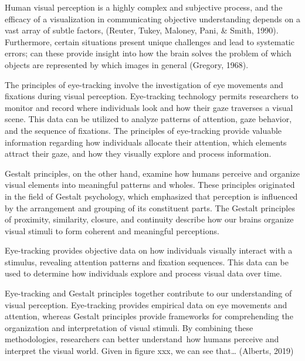 \documentclass[print]{nuthesis}
\begin{document}
Human visual perception is a highly complex and subjective process, and the efficacy of a visualization in communicating objective understanding depends on a vast array of subtle factors, (Reuter, Tukey, Maloney, Pani, \& Smith, 1990).
Furthermore, certain situations present unique challenges and lead to systematic errors; can these provide insight into how the brain solves the problem of which objects are represented by which images in general (Gregory, 1968).

The principles of eye-tracking involve the investigation of eye movements and fixations during visual perception.
Eye-tracking technology permits researchers to monitor and record where individuals look and how their gaze traverses a visual scene.
This data can be utilized to analyze patterns of attention, gaze behavior, and the sequence of fixations.
The principles of eye-tracking provide valuable information regarding how individuals allocate their attention, which elements attract their gaze, and how they visually explore and process information.

Gestalt principles, on the other hand, examine how humans perceive and organize visual elements into meaningful patterns and wholes.
These principles originated in the field of Gestalt psychology, which emphasized that perception is influenced by the arrangement and grouping of its constituent parts.
The Gestalt principles of proximity, similarity, closure, and continuity describe how our brains organize visual stimuli to form coherent and meaningful perceptions.

Eye-tracking provides objective data on how individuals visually interact with a stimulus, revealing attention patterns and fixation sequences.
This data can be used to determine how individuals explore and process visual data over time.

Eye-tracking and Gestalt principles together contribute to our understanding of visual perception.
Eye-tracking provides empirical data on eye movements and attention, whereas Gestalt principles provide frameworks for comprehending the organization and interpretation of visual stimuli.
By combining these methodologies, researchers can better understand~how humans perceive and interpret the visual world.
Given in figure xxx, we can see that\ldots{} (Alberts, 2019)
\end{document}

